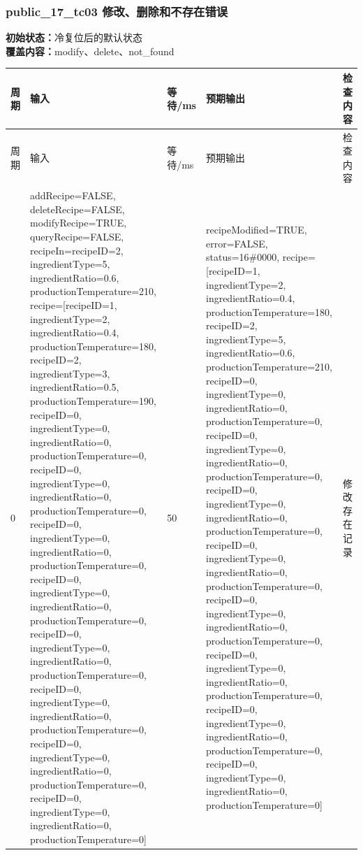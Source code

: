 \subsubsection{{\ttfamily public\_17\_tc03} 修改、删除和不存在错误}

\noindent\textbf{初始状态：}冷复位后的默认状态\\

\textbf{覆盖内容：}modify、delete、not\_found

\begin{longtable}{L{1.0cm}L{4.7cm}L{1.4cm}L{4.0cm}L{2.1cm}}

\toprule

周期 & 输入 & 等待/ms & 预期输出 & 检查内容\\

\midrule

\endfirsthead

\toprule

周期 & 输入 & 等待/ms & 预期输出 & 检查内容\\

\midrule

\endhead

0 & addRecipe=FALSE, deleteRecipe=FALSE, modifyRecipe=TRUE, queryRecipe=FALSE, recipeIn=recipeID=2, ingredientType=5, ingredientRatio=0.6, productionTemperature=210, recipe=[recipeID=1, ingredientType=2, ingredientRatio=0.4, productionTemperature=180, recipeID=2, ingredientType=3, ingredientRatio=0.5, productionTemperature=190, recipeID=0, ingredientType=0, ingredientRatio=0, productionTemperature=0, recipeID=0, ingredientType=0, ingredientRatio=0, productionTemperature=0, recipeID=0, ingredientType=0, ingredientRatio=0, productionTemperature=0, recipeID=0, ingredientType=0, ingredientRatio=0, productionTemperature=0, recipeID=0, ingredientType=0, ingredientRatio=0, productionTemperature=0, recipeID=0, ingredientType=0, ingredientRatio=0, productionTemperature=0, recipeID=0, ingredientType=0, ingredientRatio=0, productionTemperature=0, recipeID=0, ingredientType=0, ingredientRatio=0, productionTemperature=0] & 50 & recipeModified=TRUE, error=FALSE, status=16\#0000, recipe=[recipeID=1, ingredientType=2, ingredientRatio=0.4, productionTemperature=180, recipeID=2, ingredientType=5, ingredientRatio=0.6, productionTemperature=210, recipeID=0, ingredientType=0, ingredientRatio=0, productionTemperature=0, recipeID=0, ingredientType=0, ingredientRatio=0, productionTemperature=0, recipeID=0, ingredientType=0, ingredientRatio=0, productionTemperature=0, recipeID=0, ingredientType=0, ingredientRatio=0, productionTemperature=0, recipeID=0, ingredientType=0, ingredientRatio=0, productionTemperature=0, recipeID=0, ingredientType=0, ingredientRatio=0, productionTemperature=0, recipeID=0, ingredientType=0, ingredientRatio=0, productionTemperature=0, recipeID=0, ingredientType=0, ingredientRatio=0, productionTemperature=0] & 修改存在记录\\


\end{longtable}
